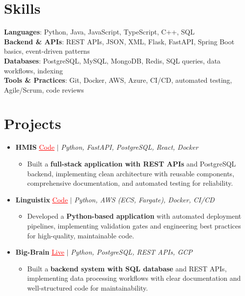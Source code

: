 \documentclass[letterpaper,10pt]{article}
\newcommand{\resumeItem}[1]{\item\small{{#1 \vspace{-2pt}}}}
\newcommand{\resumeProjectHeading}[1]{\item \small #1 \vspace{-2pt}}
\newcommand{\resumeSubHeadingListStart}{\begin{itemize}[leftmargin=0.0in, label={}]}
\newcommand{\resumeSubHeadingListEnd}{\end{itemize}}
\newcommand{\resumeProjItemListStart}{\begin{itemize}[leftmargin=0.15in,label=\textbullet,itemsep=0pt,topsep=0pt,parsep=0pt,partopsep=0pt]}
\newcommand{\resumeProjItemListEnd}{\end{itemize}\vspace{-4pt}}
\begin{document}
\section{Skills}
\begin{itemize}[leftmargin=0.15in, label={}]
\small{\item{
\textbf{Languages}: Python, Java, JavaScript, TypeScript, C++, SQL \\
\textbf{Backend \& APIs}: REST APIs, JSON, XML, Flask, FastAPI, Spring Boot basics, event-driven patterns \\
\textbf{Databases}: PostgreSQL, MySQL, MongoDB, Redis, SQL queries, data workflows, indexing \\
\textbf{Tools \& Practices}: Git, Docker, AWS, Azure, CI/CD, automated testing, Agile/Scrum, code reviews
}}
\end{itemize}
\vspace{-16pt}
\section{Projects}
\resumeSubHeadingListStart
\vspace{-2pt}
\resumeProjectHeading{\textbf{HMIS} {\href{https://github.com/SAHAJ-BHADJA/HospitalManagementSystem}{\textcolor{red}{\underline{Code}}}} $|$ \emph{Python, FastAPI, PostgreSQL, React, Docker}}
\resumeProjItemListStart
\resumeItem{Built a \textbf{full-stack application with REST APIs} and PostgreSQL backend, implementing clean architecture with reusable components, comprehensive documentation, and automated testing for reliability.}
\resumeProjItemListEnd
\vspace{3pt}
\resumeProjectHeading{\textbf{Linguistix} {\href{https://github.com/SAHAJ-BHADJA/Linguistix}{\textcolor{red}{\underline{Code}}}} $|$ \emph{Python, AWS (ECS, Fargate), Docker, CI/CD}}
\resumeProjItemListStart
\resumeItem{Developed a \textbf{Python-based application} with automated deployment pipelines, implementing validation gates and engineering best practices for high-quality, maintainable code.}
\resumeProjItemListEnd
\vspace{3pt}
\resumeProjectHeading{\textbf{Big-Brain} {\href{https://big-brain-pied.vercel.app/}{\textcolor{red}{\underline{Live}}}} $|$ \emph{Python, PostgreSQL, REST APIs, GCP}}
\resumeProjItemListStart
\resumeItem{Built a \textbf{backend system with SQL database} and REST APIs, implementing data processing workflows with clear documentation and well-structured code for maintainability.}
\resumeProjItemListEnd
\resumeSubHeadingListEnd
\end{document}
